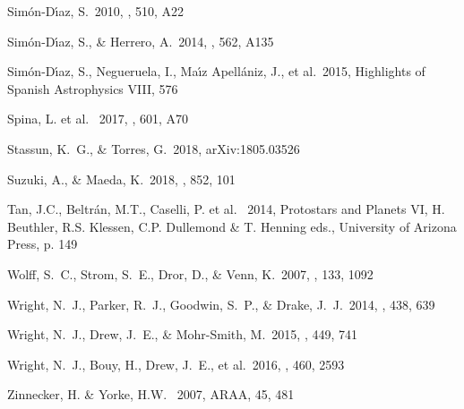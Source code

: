 \documentclass{aa} %
\begin{document}
\begin{thebibliography}{}
     Sim{\'o}n-D{\'{\i}}az, S.\ 2010, \aap, 510, A22
    
	  Sim{\'o}n-D{\'{\i}}az, S., \& Herrero, A.\ 2014, \aap, 562, A135 
    
     
    Sim{\'o}n-D{\'{\i}}az, S., Negueruela, I., Ma{\'{\i}}z Apell{\'a}niz, J., et al.\ 2015, Highlights of Spanish Astrophysics VIII, 576     
     
    
     Spina, L. et al. \ 2017, \aap, 601, A70 
	
	 Stassun, K.~G., \& Torres, G.\ 2018, arXiv:1805.03526 	

	 Suzuki, A., \& Maeda, K.\ 2018, \apj, 852, 101 

	 Tan, J.C., Beltr\'an, M.T., Caselli, P. et al. \ 2014, Protostars and Planets VI, H. Beuthler, R.S. Klessen, C.P. Dullemond \& T. Henning eds., University of Arizona Press, p. 149
 
	 Wolff, S.~C., Strom, S.~E., Dror, D., \& Venn, K.\ 2007, \aj, 133, 1092 


	 Wright, N.~J., Parker, R.~J., Goodwin, S.~P., \& Drake, J.~J.\ 2014, \mnras, 438, 639

	 Wright, N.~J., Drew, J.~E., \& Mohr-Smith, M.\ 2015, \mnras, 449, 741 
    
	 Wright, N.~J., Bouy, H., Drew, J.~E., et al.\ 2016, \mnras, 460, 2593    
    
     Zinnecker, H. \& Yorke, H.W. \ 2007, ARAA, 45, 481
	
	

\end{thebibliography}
\end{document}
